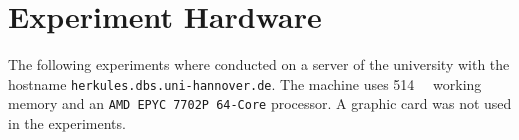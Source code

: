 \section{Experiment Hardware}
The following experiments where conducted on a server of the university with the hostname \texttt{herkules.dbs.uni-hannover.de}. The machine uses \SI{514}{\gibi\byte} working memory and an \texttt{AMD EPYC 7702P 64-Core} processor. A graphic card was not used in the experiments.
